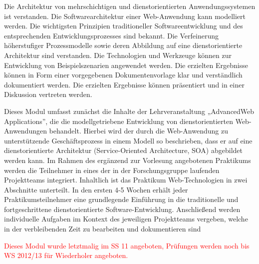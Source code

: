 \begin{module}
\begin{styleenv}
\end{styleenv}

\begin{learningoutcomes}
Die Architektur von mehrschichtigen und dienstorientierten Anwendungssystemen ist verstanden. \newline
 Die Softwarearchitektur einer Web-Anwendung kann modelliert werden.\newline
 Die wichtigsten Prinzipien traditioneller Softwareentwicklung und des entsprechenden Entwicklungsprozesses sind bekannt.\newline
 Die Verfeinerung höherstufiger Prozessmodelle sowie deren Abbildung auf eine dienstorientierte Architektur sind verstanden.\newline
Die Technologien und Werkzeuge können zur Entwicklung von Beispielszenarien angewendet werden.\newline
Die erzielten Ergebnisse können in Form einer vorgegebenen Dokumentenvorlage klar und verständlich dokumentiert werden.\newline
Die erzielten Ergebnisse können präsentiert und in einer Diskussion vertreten werden.


\end{learningoutcomes}

\begin{content}
Dieses Modul umfasst zunächst die Inhalte der Lehrveranstaltung „AdvancedWeb Applications”, die die modellgetriebene Entwicklung von dienstorientierten Web-Anwendungen behandelt. Hierbei wird der durch die Web-Anwendung zu unterstützende Geschäftsprozess in einem Modell so beschrieben, dass er auf eine dienstorientierte Architektur (Service-Oriented Architecture, SOA) abgebildet werden kann.\newline
Im Rahmen des ergänzend zur Vorlesung angebotenen Praktikums werden die Teilnehmer in eines der in der Forschungsgruppe laufenden Projektteams integriert. Inhaltlich ist das Praktikum Web-Technologien in zwei Abschnitte unterteilt. In den ersten 4-5 Wochen erhält jeder Praktikumsteilnehmer eine grundlegende Einführung in die traditionelle und fortgeschrittene dienstorientierte Software-Entwicklung. Anschließend werden individuelle Aufgaben im Kontext des jeweiligen Projektteams vergeben, welche in der verbleibenden\newline
Zeit zu bearbeiten und dokumentieren sind


\end{content}

\begin{remarks}\textcolor{red}{Dieses Modul wurde letztmalig im SS 11 angeboten, Prüfungen werden noch bis WS 2012/13 für Wiederholer angeboten.}

\end{remarks}

\end{module}


